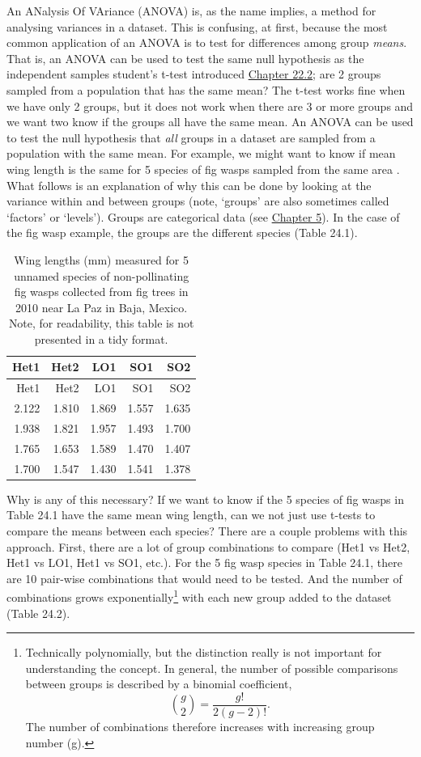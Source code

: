 \documentclass[
]{scrbook}
\begin{document}
An ANalysis Of VAriance (ANOVA) is, as the name implies, a method for analysing variances in a dataset.
This is confusing, at first, because the most common application of an ANOVA is to test for differences among group \emph{means}.
That is, an ANOVA can be used to test the same null hypothesis as the independent samples student's t-test introduced \protect\hyperlink{independent-samples-t-test}{Chapter 22.2}; are 2 groups sampled from a population that has the same mean?
The t-test works fine when we have only 2 groups, but it does not work when there are 3 or more groups and we want two know if the groups all have the same mean.
An ANOVA can be used to test the null hypothesis that \emph{all} groups in a dataset are sampled from a population with the same mean.
For example, we might want to know if mean wing length is the same for 5 species of fig wasps sampled from the same area \citep{Duthie2015b}.
What follows is an explanation of why this can be done by looking at the variance within and between groups (note, `groups' are also sometimes called `factors' or `levels').
Groups are categorical data (see \protect\hyperlink{Chapter_5}{Chapter 5}).
In the case of the fig wasp example, the groups are the different species (Table 24.1).

\begin{longtable}[]{@{}rrrrr@{}}
\caption{\label{tab:unnamed-chunk-108}Wing lengths (mm) measured for 5 unnamed species of non-pollinating fig wasps collected from fig trees in 2010 near La Paz in Baja, Mexico. Note, for readability, this table is not presented in a tidy format.}\tabularnewline
\toprule
Het1 & Het2 & LO1 & SO1 & SO2 \\
\midrule
\endfirsthead
\toprule
Het1 & Het2 & LO1 & SO1 & SO2 \\
\midrule
\endhead
2.122 & 1.810 & 1.869 & 1.557 & 1.635 \\
1.938 & 1.821 & 1.957 & 1.493 & 1.700 \\
1.765 & 1.653 & 1.589 & 1.470 & 1.407 \\
1.700 & 1.547 & 1.430 & 1.541 & 1.378 \\
\bottomrule
\end{longtable}

Why is any of this necessary?
If we want to know if the 5 species of fig wasps in Table 24.1 have the same mean wing length, can we not just use t-tests to compare the means between each species?
There are a couple problems with this approach.
First, there are a lot of group combinations to compare (Het1 vs Het2, Het1 vs LO1, Het1 vs SO1, etc.).
For the 5 fig wasp species in Table 24.1, there are 10 pair-wise combinations that would need to be tested.
And the number of combinations grows exponentially\footnote{Technically polynomially, but the distinction really is not important for understanding the concept. In general, the number of possible comparisons between groups is described by a binomial coefficient, \[\binom{g}{2} = \frac{g!}{2\left(g - 2 \right)!}.\] The number of combinations therefore increases with increasing group number (g).} with each new group added to the dataset (Table 24.2).
\end{document}
